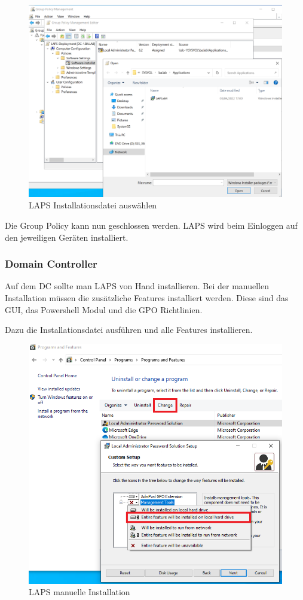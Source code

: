 \begin{figure}[H]
    \centering
    \includegraphics[width=0.7\linewidth]{../img/LAPS/GPO-Edit-Deployment-2.png}
    \caption{LAPS Installationsdatei auswählen}
\end{figure}
Die Group Policy kann nun geschlossen werden.
LAPS wird beim Einloggen auf den jeweiligen Geräten installiert.

\subsubsection{Domain Controller}
Auf dem DC sollte man LAPS von Hand installieren.
Bei der manuellen Installation müssen die zusätzliche Features installiert werden.
Diese sind das GUI, das Powershell Modul und die GPO Richtlinien.

Dazu die Installationsdatei ausführen und alle Features installieren.
\begin{figure}[H]
    \centering
    \includegraphics[width=0.7\linewidth]{../img/LAPS/laps-ui-install-2.png}
    \caption{LAPS manuelle Installation}
\end{figure}



